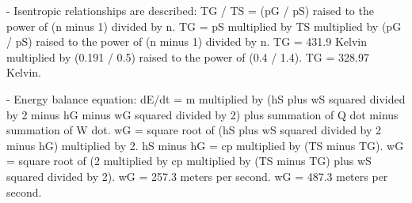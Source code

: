 - Isentropic relationships are described:  
  TG / TS = (pG / pS) raised to the power of (n minus 1) divided by n.  
  TG = pS multiplied by TS multiplied by (pG / pS) raised to the power of (n minus 1) divided by n.  
  TG = 431.9 Kelvin multiplied by (0.191 / 0.5) raised to the power of (0.4 / 1.4).  
  TG = 328.97 Kelvin.  

- Energy balance equation:  
  dE/dt = m multiplied by (hS plus wS squared divided by 2 minus hG minus wG squared divided by 2) plus summation of Q dot minus summation of W dot.  
  wG = square root of (hS plus wS squared divided by 2 minus hG) multiplied by 2.  
  hS minus hG = cp multiplied by (TS minus TG).  
  wG = square root of (2 multiplied by cp multiplied by (TS minus TG) plus wS squared divided by 2).  
  wG = 257.3 meters per second.  
  wG = 487.3 meters per second.